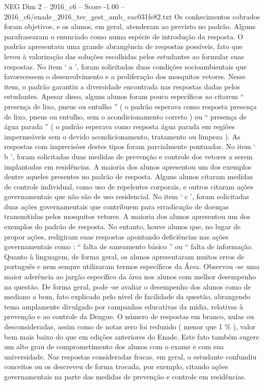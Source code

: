 \begin{textsample}{NEG Dim 2 – 2016\_c6 – Score -1.00 – 2016\_c6/enade\_2016\_tec\_gest\_amb\_eac031fe82.txt}
Os conhecimentos cobrados foram objetivos, e os alunos, em geral, atenderam ao previsto no padrão.
Alguns parafrasearam o enunciado como numa espécie de introdução da resposta.
O padrão apresentava uma grande abrangência de respostas possíveis, fato que levou à valorização das soluções escolhidas pelos estudantes ao formular suas respostas.
No item ‘ a ’, foram solicitadas duas condições socioambientais que favorecessem o desenvolvimento e a proliferação dos mosquitos vetores.
Nesse item, o padrão garantiu a diversidade encontrada nas respostas dadas pelos estudantes.
Apesar disso, alguns alunos foram pouco específicos ao citarem “ presença de lixo, pneus ou entulho ” ( o padrão esperava como resposta presença de lixo, pneus ou entulho, sem o acondicionamento correto ) ou “ presença de água parada ” ( o padrão esperava como resposta água parada em regiões impermeáveis sem o devido acondicionamento, tratamento ou limpeza ).
As respostas com imprecisões destes tipos foram parcialmente pontuadas.
No item ‘ b ’, foram solicitadas duas medidas de prevenção e controle dos vetores a serem implantadas em residências.
A maioria dos alunos apresentou um dos exemplos dentre aqueles presentes no padrão de resposta.
Alguns alunos citaram medidas de controle individual, como uso de repelentes corporais, e outros citaram ações governamentais que não são de uso residencial.
No item ‘ c ’, foram solicitadas duas ações governamentais que contribuem para erradicação de doenças transmitidas pelos mosquitos vetores.
A maioria dos alunos apresentou um dos exemplos do padrão de resposta.
No entanto, houve alunos que, no lugar de propor ações, redigiram suas respostas apontando deficiências nas ações governamentais como : “ falta de saneamento básico ” ou “ falta de informação.
Quanto à linguagem, de forma geral, os alunos apresentaram muitos erros de português e nem sempre utilizaram termos específicos da Área.
Observou -se uma maior aderência ao jargão específico da área nos alunos com melhor desempenho na questão.
De forma geral, pode -se avaliar o desempenho dos alunos como de mediano a bom, fato explicado pelo nível de facilidade da questão, abrangendo tema amplamente divulgado por campanhas educativas da mídia, relativas à prevenção e ao controle da Dengue.
O número de respostas em branco, nulas ou desconsideradas, assim como de notas zero foi reduzido ( menor que 1 \% ), valor bem mais baixo do que em edições anteriores do Enade.
Este fato também sugere um alto grau de comprometimento dos alunos com o exame e com sua universidade.
Nas respostas consideradas fracas, em geral, o estudante confundiu conceitos ou os descreveu de forma trocada, por exemplo, citando ações governamentais na parte das medidas de prevenção e controle em residências.

\end{textsample}
